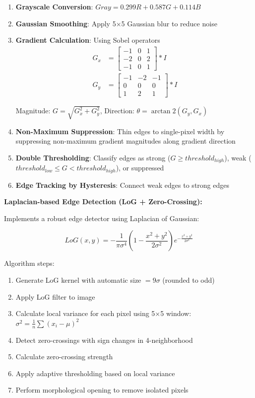 \documentclass[12pt,a4paper]{article}
\begin{document}
\begin{enumerate}
    \item \textbf{Grayscale Conversion}: $Gray = 0.299R + 0.587G + 0.114B$

    \item \textbf{Gaussian Smoothing}: Apply 5×5 Gaussian blur to reduce noise

    \item \textbf{Gradient Calculation}: Using Sobel operators
    \begin{align}
    G_x &= \begin{bmatrix} -1 & 0 & 1 \\ -2 & 0 & 2 \\ -1 & 0 & 1 \end{bmatrix} * I \\
    G_y &= \begin{bmatrix} -1 & -2 & -1 \\ 0 & 0 & 0 \\ 1 & 2 & 1 \end{bmatrix} * I
    \end{align}

    Magnitude: $G = \sqrt{G_x^2 + G_y^2}$, Direction: $\theta = \arctan2(G_y, G_x)$

    \item \textbf{Non-Maximum Suppression}: Thin edges to single-pixel width by suppressing non-maximum gradient magnitudes along gradient direction

    \item \textbf{Double Thresholding}: Classify edges as strong ($G \geq threshold_{high}$), weak ($threshold_{low} \leq G < threshold_{high}$), or suppressed

    \item \textbf{Edge Tracking by Hysteresis}: Connect weak edges to strong edges
\end{enumerate}

\textbf{Laplacian-based Edge Detection (LoG + Zero-Crossing):}

Implements a robust edge detector using Laplacian of Gaussian:

\begin{equation}
LoG(x,y) = -\frac{1}{\pi\sigma^4}\left(1 - \frac{x^2+y^2}{2\sigma^2}\right)e^{-\frac{x^2+y^2}{2\sigma^2}}
\end{equation}

Algorithm steps:
\begin{enumerate}
    \item Generate LoG kernel with automatic size $= 9\sigma$ (rounded to odd)
    \item Apply LoG filter to image
    \item Calculate local variance for each pixel using 5×5 window: $\sigma^2 = \frac{1}{n}\sum(x_i - \mu)^2$
    \item Detect zero-crossings with sign changes in 4-neighborhood
    \item Calculate zero-crossing strength
    \item Apply adaptive thresholding based on local variance
    \item Perform morphological opening to remove isolated pixels
\end{enumerate}
\end{document}
